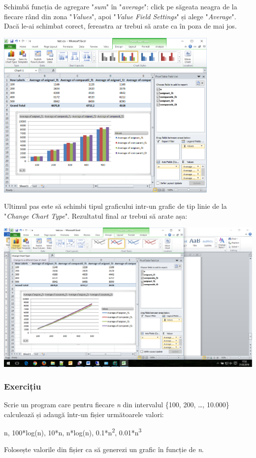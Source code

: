 \documentclass[../ro-fa-lab.tex]{subfiles}
\begin{document}
Schimbă funcția de agregare "\emph{sum}" în "\emph{average}": click pe
săgeata neagra de la fiecare rând din zona "\emph{Values}", apoi
"\emph{Value Field Settings}" și alege "\emph{Average}". Dacă le-ai
schimbat corect, fereastra ar trebui să arate ca în poza de mai jos.

\includegraphics[width=4.29645in,height=3.26824in]{../Resources/lab0/image14.png}

Ultimul pas este să schimbi tipul graficului intr-un grafic de tip linie
de la "\emph{Change Chart Type}". Rezultatul final ar trebui să arate
așa:

\includegraphics[width=\textwidth]{../Resources/lab0/image15.png}

\subsubsection{Exercițiu}\label{exerciux21biu}

Scrie un program care pentru fiecare \emph{n} din intervalul \{100, 200,
\ldots, 10.000\} calculează și adaugă într-un fișier următoarele valori:

n, 100*log(n), 10*n, n*log(n), 0.1*n\textsuperscript{2},
0.01*n\textsuperscript{3}

Folosește valorile din fișier ca să generezi un grafic în funcție de
\emph{n}.
\end{document}
